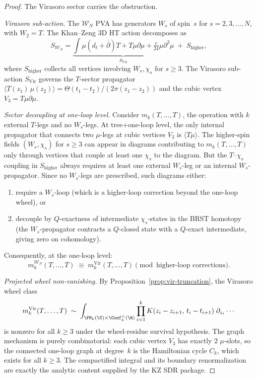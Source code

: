 \begin{proof}
The Virasoro sector carries the obstruction.

\medskip
\emph{Virasoro sub-action.}
The $\mathcal{W}_N$ PVA has generators $W_s$ of spin~$s$ for
$s = 2, 3, \ldots, N$, with $W_2 = T$. The Khan--Zeng 3D HT action
decomposes as
\[
S_{\mathcal{W}_N}
= \underbrace{\int \mu(d_t + \bar\partial)T + T\mu\partial\mu
 + \tfrac{c}{24}\mu\partial^3\mu}_{S_{\mathrm{Vir}}}
\;+\; S_{\mathrm{higher}},
\]
where $S_{\mathrm{higher}}$ collects all vertices involving
$W_s, \chi_s$ for $s \ge 3$. The Virasoro sub-action
$S_{\mathrm{Vir}}$ governs the $T$-sector propagator
$\langle T(z_1)\,\mu(z_2) \rangle = \Theta(t_1-t_2)/(2\pi(z_1-z_2))$
and the cubic vertex $V_3 = T\mu\partial\mu$.

\medskip
\emph{Sector decoupling at one-loop level.}
Consider $m_k(T, \ldots, T)$, the operation with $k$ external
$T$-legs and no $W_s$-legs. At tree+one-loop level, the only
internal propagator that connects two $\mu$-legs at cubic
vertices $V_3$ is $\langle T\mu \rangle$. The higher-spin fields
$(W_s, \chi_s)$ for $s \ge 3$ can appear in diagrams contributing
to $m_k(T, \ldots, T)$ only through vertices that couple at least
one $\chi_s$ to the diagram. But the $T$--$\chi_s$ coupling in
$S_{\mathrm{higher}}$ always requires at least one external
$W_s$-leg or an internal $W_s$-propagator. Since no $W_s$-legs
are prescribed, such diagrams either:
\begin{enumerate}[label=(\alph*)]
\item require a $W_s$-loop (which is a higher-loop correction
 beyond the one-loop wheel), or
\item decouple by $Q$-exactness of intermediate $\chi_s$-states
 in the BRST homotopy (the $W_s$-propagator contracts a
 $Q$-closed state with a $Q$-exact intermediate, giving zero
 on cohomology).
\end{enumerate}
Consequently, at the one-loop level:
\begin{equation}
\label{eq:wn-sector-decoupling}
m_k^{\mathcal{W}_N}(T, \ldots, T)
\;\equiv\; m_k^{\mathrm{Vir}}(T, \ldots, T)
\pmod{\text{higher-loop corrections}}.
\end{equation}

\medskip
\emph{Projected wheel non-vanishing.}
By Proposition~\ref{prop:vir-truncation}, the Virasoro wheel class
\[
m_k^{\mathrm{Vir}}(T, \ldots, T)
\;\sim\; \int_{\FM_k(\C) \times \Conf_k^{<}(\R)}
 \prod_{i=1}^k K(z_i - z_{i+1},\, t_i - t_{i+1})\;
 \partial_{z_i}\cdots
\]
is nonzero for all $k \ge 3$ under the wheel-residue survival
hypothesis. The graph mechanism is purely combinatorial: each cubic
vertex $V_3$ has exactly $2$ $\mu$-slots, so the connected one-loop
graph at degree~$k$ is the Hamiltonian cycle $C_k$, which exists for
all $k \ge 3$. The compactified integral and its boundary
renormalization are exactly the analytic content supplied by the KZ SDR
package.


\end{proof}
